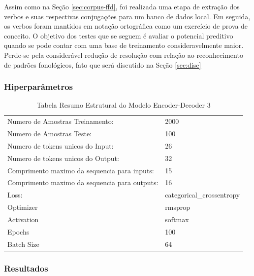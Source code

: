 Assim como na Seção \ref{sec:corpus-ffd}, foi realizada uma etapa de extração dos verbos e suas respectivas conjugações para um banco de dados local. Em seguida, os verbos foram mantidos em notação ortográfica como um exercício de prova de conceito. O objetivo dos testes que se seguem é avaliar o potencial preditivo quando se pode contar com uma base de treinamento consideravelmente maior. Perde-se pela considerável redução de resolução com relação ao reconhecimento de padrões fonológicos, fato que será discutido na Seção \ref{sec:disc}

\subsubsection{Hiperparâmetros} 

\begin{table}[H]
\centering
\begin{tabular}{ll}
Numero de Amostras Treinamento: & 2000 \\
Numero de Amostras Teste: & 100 \\
Numero de tokens unicos do Input: & 26 \\
Numero de tokens unicos do Output: & 32 \\
Comprimento maximo da sequencia para inputs: & 15 \\
Comprimento maximo da sequencia para outputs: & 16 \\
Loss: & categorical\_crossentropy \\
Optimizer & rmsprop \\
Activation & softmax \\
Epochs & 100 \\
Batch Size & 64
\end{tabular}
\caption{Tabela Resumo Estrutural do Modelo Encoder-Decoder 3}
\label{tab:resumo3}
\end{table}

\subsubsection{Resultados}

